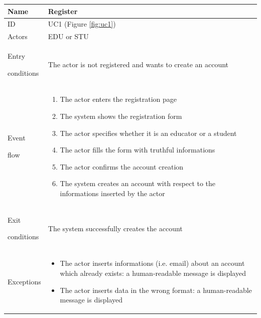 \begin{center}
    \def\arraystretch{1.5}
    \begin{tabular}{| m{2cm} | m{10cm}|}
        \hline
        Name                  & Register                                                                                                                      \\ \hline
        ID                    & UC1 (Figure \ref{fig:uc1})                                                                                                                        \\ \hline
        Actors                & EDU or STU                                                                                                                    \\ \hline
        Entry \par conditions & The actor is not registered and wants to create an account                                                                    \\ \hline
        Event \par flow       & \begin{enumerate}
                                    \item The actor enters the registration page
                                    \item The system shows the registration form
                                    \item The actor specifies whether it is an educator or a student
                                    \item The actor fills the form with truthful informations
                                    \item The actor confirms the account creation
                                    \item The system creates an account with respect to the informations inserted by the actor
                                \end{enumerate}                                     \\ \hline
        Exit \par conditions  & The system successfully creates the account                                                                                   \\ \hline
        Exceptions            & \begin{itemize}
                                    \item The actor inserts informations (i.e. email) about an account which already exists: a human-readable message is displayed
                                    \item The actor inserts data in the wrong format: a human-readable message is displayed
                                \end{itemize} \\ \hline
    \end{tabular}
\end{center}

